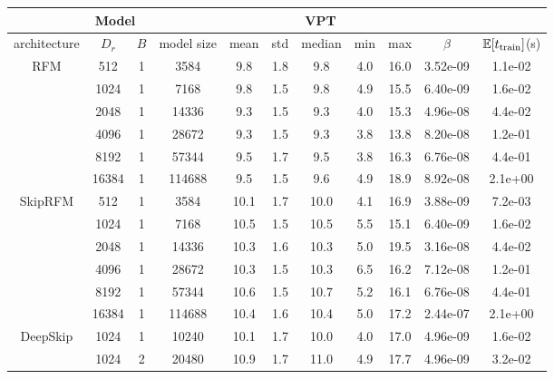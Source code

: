 \begin{table}[!htp]
    \centering
    \begin{tabular}{|c|c|c|c|c|c|c|c|c|c|c|} \hline
\multicolumn{4}{|c|}{Model} &\multicolumn{5}{c|}{VPT} & \multicolumn{2}{c|}{}\\ \hline
architecture & $D_r$ & $B$ & model size & mean & std & median & min & max &$\beta$ & $\mathbb{E}[t_{\rm train}]$(s)\\ \hline\hline
\multirow{6}{*}{RFM} & \cellcolor{pink}512 & \cellcolor{pink}1 & \cellcolor{pink}3584 & \cellcolor{pink}9.8 & \cellcolor{pink}1.8 & \cellcolor{pink}9.8 & \cellcolor{pink}4.0 & \cellcolor{pink}16.0 & \cellcolor{pink}3.52e-09 & \cellcolor{pink}1.1e-02\\ \cline{2-11}
 & 1024 & 1 & 7168 & 9.8 & 1.5 & 9.8 & 4.9 & 15.5 & 6.40e-09 & 1.6e-02\\ \cline{2-11}
 & 2048 & 1 & 14336 & 9.3 & 1.5 & 9.3 & 4.0 & 15.3 & 4.96e-08 & 4.4e-02\\ \cline{2-11}
 & 4096 & 1 & 28672 & 9.3 & 1.5 & 9.3 & 3.8 & 13.8 & 8.20e-08 & 1.2e-01\\ \cline{2-11}
 & 8192 & 1 & 57344 & 9.5 & 1.7 & 9.5 & 3.8 & 16.3 & 6.76e-08 & 4.4e-01\\ \cline{2-11}
 & 16384 & 1 & 114688 & 9.5 & 1.5 & 9.6 & 4.9 & 18.9 & 8.92e-08 & 2.1e+00\\ \cline{2-11}
\hline\hline
\multirow{6}{*}{SkipRFM} & 512 & 1 & 3584 & 10.1 & 1.7 & 10.0 & 4.1 & 16.9 & 3.88e-09 & 7.2e-03\\ \cline{2-11}
 & 1024 & 1 & 7168 & 10.5 & 1.5 & 10.5 & 5.5 & 15.1 & 6.40e-09 & 1.6e-02\\ \cline{2-11}
 & 2048 & 1 & 14336 & 10.3 & 1.6 & 10.3 & 5.0 & 19.5 & 3.16e-08 & 4.4e-02\\ \cline{2-11}
 & 4096 & 1 & 28672 & 10.3 & 1.5 & 10.3 & 6.5 & 16.2 & 7.12e-08 & 1.2e-01\\ \cline{2-11}
 & \cellcolor{pink}8192 & \cellcolor{pink}1 & \cellcolor{pink}57344 & \cellcolor{pink}10.6 & \cellcolor{pink}1.5 & \cellcolor{pink}10.7 & \cellcolor{pink}5.2 & \cellcolor{pink}16.1 & \cellcolor{pink}6.76e-08 & \cellcolor{pink}4.4e-01\\ \cline{2-11}
 & 16384 & 1 & 114688 & 10.4 & 1.6 & 10.4 & 5.0 & 17.2 & 2.44e-07 & 2.1e+00\\ \cline{2-11}
\hline\hline
\multirow{19}{*}{DeepSkip} & 1024 & 1 & 10240 & 10.1 & 1.7 & 10.0 & 4.0 & 17.0 & 4.96e-09 & 1.6e-02\\ \cline{2-11}
 & 1024 & 2 & 20480 & 10.9 & 1.7 & 11.0 & 4.9 & 17.7 & 4.96e-09 & 3.2e-02\\ \cline{2-11}

\end{tabular}
\end{table}
